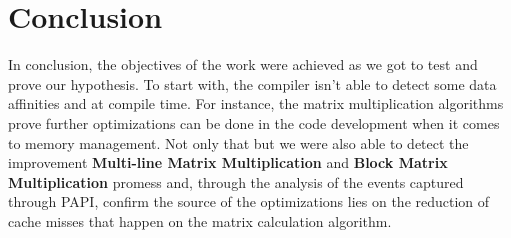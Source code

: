 \section{Conclusion}

In conclusion, the objectives of the work were achieved as we got to test and prove our hypothesis. To start with, the compiler isn't able to detect some data affinities and at compile time. For instance, the matrix multiplication algorithms prove further optimizations can be done in the code development when it comes to memory management. Not only that but we were also able to detect the improvement \textbf{Multi-line Matrix Multiplication} and \textbf{Block Matrix Multiplication} promess and, through the analysis of the events captured through PAPI, confirm the source of the optimizations lies on the reduction of cache misses that happen on the matrix calculation algorithm.